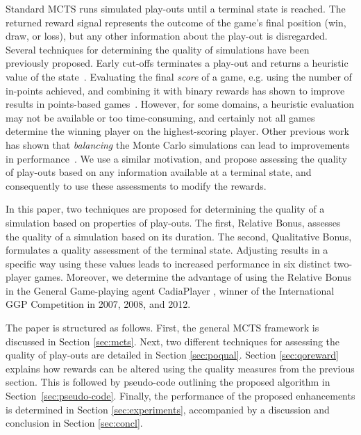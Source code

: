 \documentclass{ecai2014}
\begin{document}
Standard MCTS runs simulated play-outs until a terminal state is reached. The returned reward signal represents the outcome of the game's final position (win, draw, or loss), but any other information about the play-out is disregarded. 
Several techniques for determining the quality of simulations have been previously proposed. Early cut-offs terminates a play-out and returns a heuristic value of the state~\cite{Winands2011}. Evaluating the final \emph{score} of a game, e.g. using the number of in-points achieved, and combining it with binary rewards has shown to improve results in points-based games~\cite{shibahara2008combining}. However, for some domains, a heuristic evaluation may not be available or too time-consuming, and certainly not all games determine the winning player on the highest-scoring player.
Other previous work has shown that {\it balancing} the Monte Carlo simulations can lead to improvements in performance~\cite{silver09monte,huang11monte}. 
We use a similar motivation, and propose assessing the quality of play-outs based on any information available at a terminal state, and consequently to use these assessments to modify the rewards. 

In this paper, two techniques are proposed for determining the quality of a simulation based on properties of play-outs. The first, Relative Bonus, assesses the quality of a simulation based on its duration. The second, Qualitative Bonus, formulates a quality assessment of the terminal state. Adjusting results in a specific way using these values leads to increased performance in six distinct two-player games. Moreover, we determine the advantage of using the Relative Bonus in the General Game-playing agent {\sc CadiaPlayer} \cite{bjornsson2009cadiaplayer}, winner of the International GGP Competition in 2007, 2008, and 2012.

The paper is structured as follows. First, the general MCTS framework is discussed in Section \ref{sec:mcts}. Next, two different techniques for assessing the quality of play-outs are detailed in Section \ref{sec:poqual}. Section \ref{sec:qoreward} explains how rewards can be altered using the quality measures from the previous section. This is followed by pseudo-code outlining the proposed algorithm in Section~\ref{sec:pseudo-code}. Finally, the performance of the proposed enhancements is determined in Section \ref{sec:experiments}, accompanied by a discussion and conclusion in Section \ref{sec:concl}.

\end{document}
